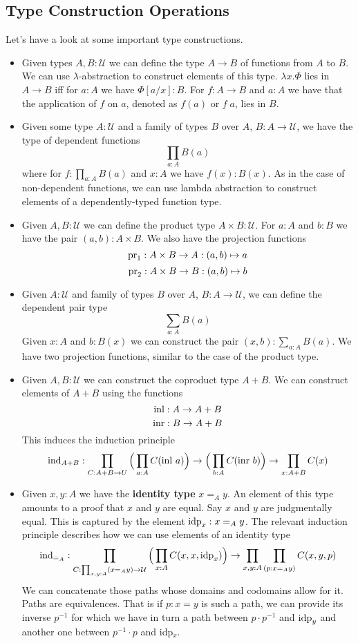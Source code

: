 \documentclass[12pt]{article}
\begin{document}
\subsection{Type Construction Operations}
Let's have a look at some important type constructions.
\begin{itemize}
	\item Given types $A, B : \mathcal{U}$ we can define the type $A \rightarrow B$ of functions from $A$ to $B$. 
		We can use $\lambda$-abstraction to construct elements of this type. $\lambda x. \Phi$ lies in $A \rightarrow B$ iff for $a : A$ we have $\Phi[a/x] : B$. 
		For $f : A \rightarrow B$ and $a : A$ we have that the application of $f$ on $a$, denoted as $f(a)$ or $f\;a$, lies in $B$.
	\item Given some type $A : \mathcal{U}$ and a family of types $B$ over $A$, $B : A \rightarrow \mathcal{U}$, we have the type of dependent functions $$\prod_{a : A} B(a)$$
	where for $f : \prod_{a : A} B(a)$ and $x : A$ we have $f(x) : B(x)$. 
	As in the case of non-dependent functions, we can use lambda abstraction to construct elements of a dependently-typed function type.
	\item Given $A, B : \mathcal{U}$ we can define the product type $A \times B : \mathcal{U}$. 
	For $a : A$ and $b : B$ we have the pair $(a,b) : A \times B$. 
	We also have the projection functions 
	$$\textnormal{pr}_1 : A \times B \rightarrow A : (a,b) \mapsto a$$
	$$\textnormal{pr}_2 : A \times B \rightarrow B : (a,b) \mapsto b$$
	\item Given $A : \mathcal{U}$ and family of types $B$ over $A$, $B : A \rightarrow \mathcal{U}$, we can define the dependent pair type $$\sum_{a : A} B(a)$$
	Given $x : A$ and $b : B(x)$ we can construct the pair $(x,b) : \sum_{a : A} B(a)$. 
	We have two projection functions, similar to the case of the product type.
	\item Given $A, B : \mathcal{U}$ we can construct the coproduct type $A + B$. 
	We can construct elements of $A + B$ using the functions
	$$\textnormal{inl} : A \rightarrow A+B$$
	$$\textnormal{inr} : B \rightarrow A+B$$
	This induces the induction principle
	$$\textnormal{ind}_{A+B} : \prod_{C : A+B \rightarrow U} \Big(\prod_{a : A}C(\textnormal{inl }a)\Big) \rightarrow \Big(\prod_{b : A}C(\textnormal{inr }b)\Big) \rightarrow \prod_{x : A+ B}C(x)$$
	\item Given $x, y : A$ we have the \textbf{identity type} $x =_A y$. 
	An element of this type amounts to a proof that $x$ and $y$ are equal. 
	Say $x$ and $y$ are judgmentally equal. 
	This is captured by the element $\textnormal{idp}_x : x =_A y$. 
	The relevant induction principle describes how we can use elements of an identity type
	$$\textnormal{ind}_{=_{A}} : \prod_{C : \prod_{x,y : A} (x =_A y) \rightarrow \mathcal{U}} \Big( \prod_{x : A}C(x,x,\textnormal{idp}_x) \Big) \rightarrow \prod_{x,y : A} \prod_{(p : x =_A y)} C(x,y,p)$$
	We can concatenate those paths whose domains and codomains allow for it. 
	Paths are equivalences. That is if $p : x = y$ is such a  path, we can provide its inverse $p^{-1}$ for which we have in turn a path between $p\cdot p^{-1}$ and $\textnormal{idp}_y$ and another one between $p^{-1}\cdot p$ and idp$_x$. 


\end{itemize}
\end{document}
